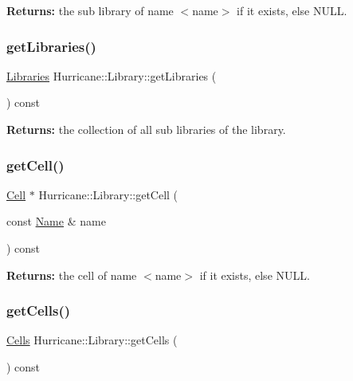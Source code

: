 {\bfseries Returns\+:} the sub library of name {\ttfamily $<$name$>$} if it exists, else N\+U\+LL. \mbox{\label{classHurricane_1_1Library_a43b3703b939b7e70261d1f9319db2bb0}} 
\subsubsection{\texorpdfstring{get\+Libraries()}{getLibraries()}}
{\footnotesize\ttfamily \hyperlink{namespaceHurricane_a2868a53bbb0507710460ff02fab77cad}{Libraries} Hurricane\+::\+Library\+::get\+Libraries (\begin{DoxyParamCaption}{ }\end{DoxyParamCaption}) const\hspace{0.3cm}{\ttfamily [inline]}}

{\bfseries Returns\+:} the collection of all sub libraries of the library. \mbox{\label{classHurricane_1_1Library_a2e6bb294c611db79e00a5a6ea00974d5}} 
\subsubsection{\texorpdfstring{get\+Cell()}{getCell()}}
{\footnotesize\ttfamily \hyperlink{classHurricane_1_1Cell}{Cell} $\ast$ Hurricane\+::\+Library\+::get\+Cell (\begin{DoxyParamCaption}\item[{const \hyperlink{classHurricane_1_1Name}{Name} \&}]{name }\end{DoxyParamCaption}) const\hspace{0.3cm}{\ttfamily [inline]}}

{\bfseries Returns\+:} the cell of name {\ttfamily $<$name$>$} if it exists, else N\+U\+LL. \mbox{\label{classHurricane_1_1Library_aae3e47aef08e50f9858fb79537f6eb41}} 
\subsubsection{\texorpdfstring{get\+Cells()}{getCells()}}
{\footnotesize\ttfamily \hyperlink{namespaceHurricane_a8b4ab14b26f36f43d83a50294410b44a}{Cells} Hurricane\+::\+Library\+::get\+Cells (\begin{DoxyParamCaption}{ }\end{DoxyParamCaption}) const\hspace{0.3cm}{\ttfamily [inline]}}

